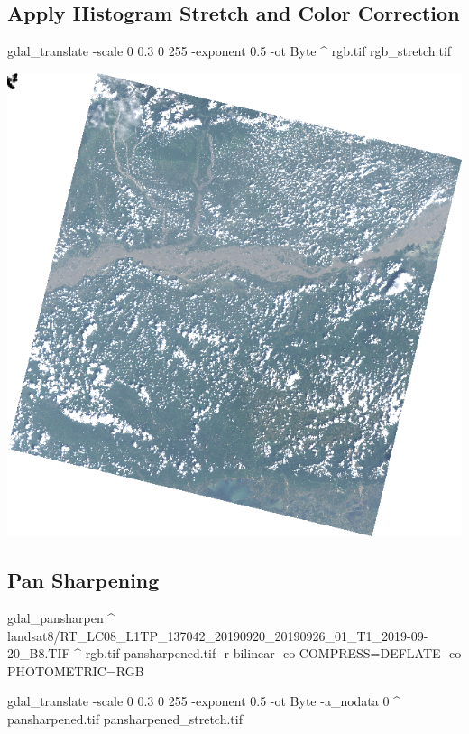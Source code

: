 \documentclass[12pt,a4paper]{article}
\newenvironment{Shaded}{\begin{snugshade}}{\end{snugshade}}
\newcommand{\ExtensionTok}[1]{#1}
\newcommand{\NormalTok}[1]{#1}
\begin{document}
\hypertarget{apply-histogram-stretch-and-color-correction}{%
\subsection{Apply Histogram Stretch and Color
Correction}\label{apply-histogram-stretch-and-color-correction}}

\begin{Shaded}
\begin{Highlighting}[]
\ExtensionTok{gdal_translate}\NormalTok{ -scale 0 0.3 0 255 -exponent 0.5 -ot Byte ^}
  \ExtensionTok{rgb.tif}\NormalTok{ rgb_stretch.tif}
\end{Highlighting}
\end{Shaded}

\begin{center}\includegraphics{images/gdal/rgb_stretch} \end{center}

\hypertarget{pan-sharpening}{%
\subsection{Pan Sharpening}\label{pan-sharpening}}

\begin{Shaded}
\begin{Highlighting}[]
\ExtensionTok{gdal_pansharpen}\NormalTok{ ^}
  \ExtensionTok{landsat8/RT_LC08_L1TP_137042_20190920_20190926_01_T1_2019-09-20_B8.TIF}\NormalTok{ ^}
  \ExtensionTok{rgb.tif}\NormalTok{ pansharpened.tif -r bilinear -co COMPRESS=DEFLATE -co PHOTOMETRIC=RGB}

\ExtensionTok{gdal_translate}\NormalTok{ -scale 0 0.3 0 255 -exponent 0.5 -ot Byte -a_nodata 0 ^}
  \ExtensionTok{pansharpened.tif}\NormalTok{ pansharpened_stretch.tif}
\end{Highlighting}
\end{Shaded}
\end{document}
